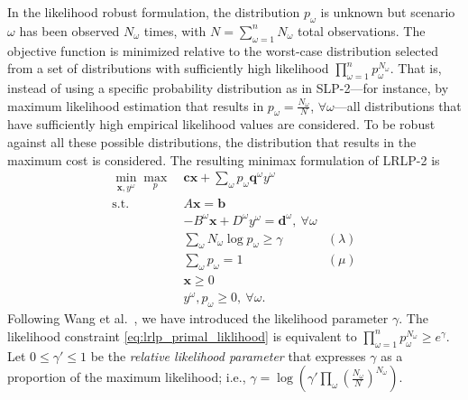 \documentclass[11pt]{article}
\newcommand{\x}{\mathbf{x}}
\renewcommand{\c}{\mathbf{c}}
\newcommand{\q}{\mathbf{q}}
\renewcommand{\b}{\mathbf{b}}
\renewcommand{\d}{\mathbf{d}}
\newcommand{\st}{\mbox{s.t.}}
\begin{document}
In the likelihood robust formulation, the distribution $p_\omega$ is unknown but scenario $\omega$ has been observed $N_\omega$ times, with $N = \sum_{\omega=1}^n N_\omega$ total observations.
The objective function is minimized relative to the worst-case distribution selected from a set of distributions with sufficiently high likelihood $\prod_{\omega=1}^n p_\omega^{N_\omega}$.
That is, instead of using a specific probability distribution as in SLP-2---for instance, by maximum likelihood estimation that results in $p_\omega = \frac{N_\omega}{N}$, $\forall \omega$---all distributions that have sufficiently high empirical likelihood values are considered. To be robust against all these possible distributions, the distribution that results in the maximum cost is considered. The resulting minimax formulation of LRLP-2 is 
\begin{align}
	\min_{\x,y^\omega} \max_p \ & \c\x + \sum_\omega p_\omega \q^\omega y^\omega \label{eq:lrlp_primal}\\
	\st \ & A\x = \b \nonumber \\
	& -B^\omega \x + D^\omega y^\omega = \d^\omega,\ \forall \omega \nonumber \\
	& \sum_\omega N_\omega \log p_\omega \geq \gamma & (\lambda) \label{eq:lrlp_primal_liklihood} \\
	& \sum_\omega p_\omega = 1 & (\mu) \label{eq:lrlp_primal_probability} \\
	& \x \geq 0 \nonumber \\
	& y^\omega, p_\omega \geq 0,\ \forall \omega. \nonumber
\end{align}
Following Wang et al.\ \cite{wang2010likelihood}, we have introduced the likelihood parameter $\gamma$.
The likelihood constraint \eqref{eq:lrlp_primal_liklihood} is equivalent to $\prod_{\omega=1}^n p_\omega^{N_\omega} \geq e^\gamma$.
Let $0 \leq \gamma' \leq 1$ be the \emph{relative likelihood parameter} that expresses $\gamma$ as a proportion of the maximum likelihood; i.e., $\gamma = \log( \gamma' \prod_\omega (\tfrac{N_\omega}{N})^{N_\omega})$.
\end{document}
